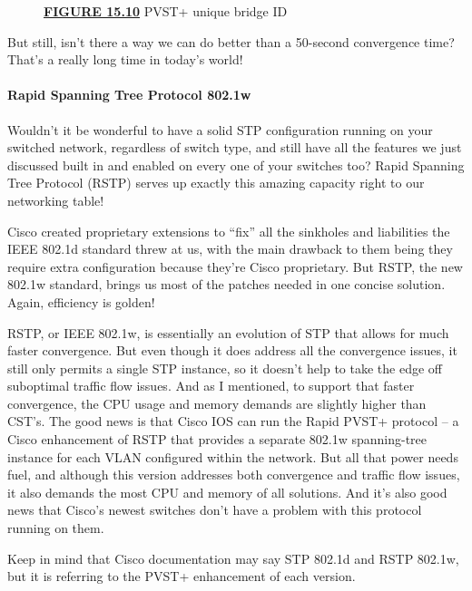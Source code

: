 \begin{figure}
\centering
\caption{{\protect\hyperlink{c15.xhtmlux5cux23figureanchor15-10}{\textbf{FIGURE
15.10}} PVST+ unique bridge ID}}
\end{figure}

But still, isn't there a way we can do better than a 50-second
convergence time? That's a really long time in today's world!

\paragraph{Rapid Spanning Tree Protocol 802.1w}

Wouldn't it be wonderful to have a solid STP configuration running on
your switched network, regardless of switch type, and still have all the
features we just discussed built
in and enabled on
every one of your switches too? Rapid Spanning Tree Protocol (RSTP)
serves up exactly this amazing capacity right to our networking table!

Cisco created proprietary extensions to ``fix'' all the sinkholes and
liabilities the IEEE 802.1d standard threw at us, with the main drawback
to them being they require extra configuration because they're Cisco
proprietary. But RSTP, the new 802.1w standard, brings us most of the
patches needed in one concise solution. Again, efficiency is golden!

RSTP, or IEEE 802.1w, is essentially an evolution of STP that allows for
much faster convergence. But even though it does address all the
convergence issues, it still only permits a single STP instance, so it
doesn't help to take the edge off suboptimal traffic flow issues. And as
I mentioned, to support that faster convergence, the CPU usage and
memory demands are slightly higher than CST's. The good news is that
Cisco IOS can run the Rapid PVST+ protocol -- a Cisco enhancement of RSTP
that provides a separate 802.1w spanning-tree instance for each VLAN
configured within the network. But all that power needs fuel, and
although this version addresses both convergence and traffic flow
issues, it also demands the most CPU and memory of all solutions. And
it's also good news that Cisco's newest switches don't have a problem
with this protocol running on them.


\begin{note}
Keep in mind that Cisco documentation may say STP 802.1d and RSTP 802.1w, but it is referring to the PVST+ enhancement of each version.
\end{note}


